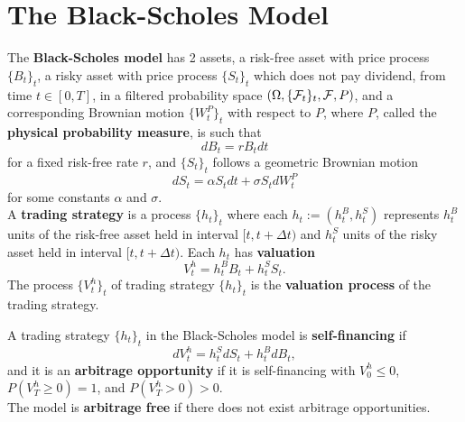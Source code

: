 \documentclass[11pt,fleqn]{book} %
\begin{document}

\section{The Black-Scholes Model}

\begin{definition} \label{def:411}
The \textbf{Black-Scholes model} has 2 assets, a risk-free asset with price process \(\{B_t\}_t\), a risky asset with price process \(\{S_t\}_t\) which does not pay dividend, from time \(t \in [0, T]\), in a filtered probability space \((\Omega, \{\mathcal{F}_t\}_t, \mathcal{F}, P)\), and a corresponding Brownian motion \(\{W_t^P\}_t\) with respect to \(P\), where \(P\), called the \textbf{physical probability measure}, is such that
\[
dB_t = rB_tdt
\]
for a fixed risk-free rate \(r\), and \(\{S_t\}_t\) follows a geometric Brownian motion
\[
dS_t = \alpha S_tdt + \sigma S_tdW_t^P
\]
for some constants \(\alpha\) and \(\sigma\). \\
\indent A \textbf{trading strategy} is a process \(\{h_t\}_t\) where each \(h_t := (h_t^B, h_t^S)\) represents \(h_t^B\) units of the risk-free asset held in interval \([t, t + \Delta t)\) and \(h_t^S\) units of the risky asset held in interval \([t, t + \Delta t)\). Each \(h_t\) has \textbf{valuation}
\[
V_t^h = h_t^BB_t + h_t^SS_t.
\]
\indent The process \(\{V_t^h\}_t\) of trading strategy \(\{h_t\}_t\) is the \textbf{valuation process} of the trading strategy.
\end{definition}

\begin{definition} \label{def:412}
A trading strategy \(\{h_t\}_t\) in the Black-Scholes model is \textbf{self-financing} if
\[
dV_t^h = h_t^SdS_t + h_t^BdB_t,
\]
and it is an \textbf{arbitrage opportunity} if it is self-financing with \(V_0^h \leq 0\), \(P(V_T^h \geq 0) = 1\), and \(P(V_T^h > 0) > 0\). \\
\indent The model is \textbf{arbitrage free} if there does not exist arbitrage opportunities.
\end{definition}
\end{document}

